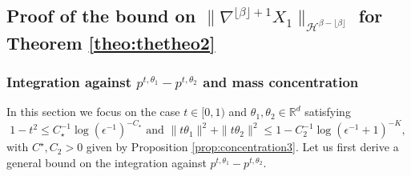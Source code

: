 \documentclass{article}
\begin{document}
\subsection{Proof of the bound on $\|\nabla^{\lfloor \beta \rfloor+1} X_1\|_{\mathcal{H}^{\beta-\lfloor \beta \rfloor}}$ for Theorem \ref{theo:thetheo2}}\label{sec:castheo1append}
\subsubsection{Integration against $p^{t,\theta_1}-p^{t,\theta_2}$ and mass concentration}
In this section we focus on the case $t\in [0,1)$ and $\theta_1,\theta_2\in \mathbb{R}^d$ satisfying 
\begin{equation}\label{eq:onremetlacontrainte}
1-t^2\leq C_\star^{-1}\log(\epsilon^{-1})^{-C_\star} \text{ and } \|t\theta_1\|^2+\|t\theta_2\|^2\leq 1-C_2^{-1}\log(\epsilon^{-1}+1)^{-K},
\end{equation}
with $C^\star,C_2>0$ given by Proposition \ref{prop:concentration3}. Let us first derive a general bound on the integration against $p^{t,\theta_1}-p^{t,\theta_2}$.
\end{document}
